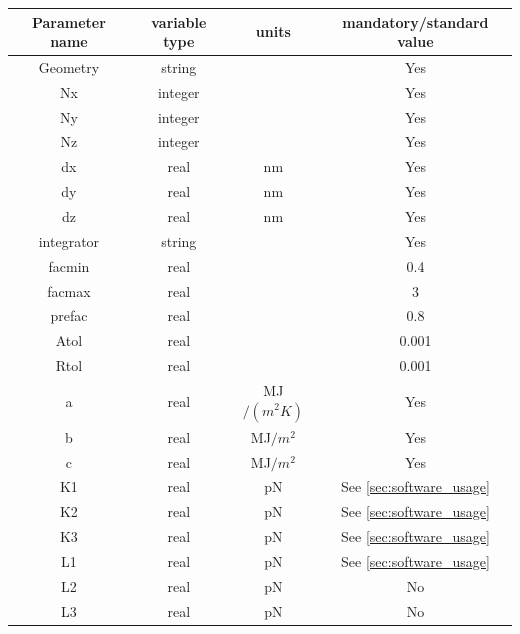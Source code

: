 \documentclass[final,5p,times,twocolumn]{elsarticle}
\begin{document}
 \onecolumn
 \begin{center}
	\begin{longtable}{|c|c|c|c|}
          \hline 
          Parameter name  & variable type	& units & mandatory/standard value\\ 
          \hline 
          {Geometry}	& string & 	& Yes  \\ 
          \hline 
          {Nx}	& integer &	& Yes \\ 
          \hline                                  
          {Ny}	& integer &      & Yes \\ 
          \hline                                  
          {Nz}	& integer &      & Yes \\ 
          \hline                                  
          {dx}	& real & nm      & Yes \\ 
          \hline                                  
          {dy}	& real & nm   & Yes \\ 
          \hline                                  
          {dz}	& real & nm	& Yes \\ 
          \hline 
          {integrator}	& string & & Yes\\ 
          \hline 
          facmin	& real &   & 0.4\\ 
          \hline 
          facmax	& real &   & 3\\ 
          \hline 
          prefac	& real &  & 0.8\\ 
          \hline 
          Atol	& real &  &0.001\\ 
          \hline 
          Rtol & real &  &0.001\\ 
          \hline 
          {a} & real& MJ$/(m^2 K)$ & Yes\\
          \hline 
          {b} & real& MJ$/m^2$ & Yes\\ 
          \hline
          {c} & real& MJ$/m^2$ & Yes\\ 
          \hline 
          {K1} & real &  pN  &  See \ref{sec:software_usage}\\ 
          \hline
          {K2} & real &  pN  &  See \ref{sec:software_usage}\\ 
          \hline
          {K3} & real &  pN  &  See \ref{sec:software_usage}\\ 
          \hline 
          {L1} & real &  pN & See \ref{sec:software_usage}\\ 
          \hline 
          {L2} & real &  pN & No   \\ 
          \hline
          { L3} & real & pN & No   \\ 

\end{longtable}
\end{center}
\end{document}
